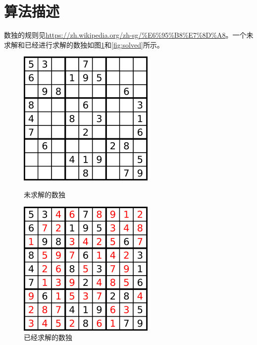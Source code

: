 \documentclass{report}
\begin{document}
\section{算法描述}
\par 数独的规则见\url{https://zh.wikipedia.org/zh-sg/%E6%95%B8%E7%8D%A8}。一个未求解和已经进行求解的数独如图\ref{fig:unsolved}和\ref{fig:solved}所示。
\begin{figure}[htpb]
    \centering
    \begin{minipage}{0.45\linewidth}
        \includegraphics[width=0.9\linewidth]{unsolved.png}
        \caption{未求解的数独}
        \label{fig:solved}
    \end{minipage}
    \hfill
    \begin{minipage}{0.45\linewidth}
        \includegraphics[width=0.9\linewidth]{solved.png}
        \caption{已经求解的数独}
        \label{fig:unsolved}
    \end{minipage}
\end{figure}
\end{document}
